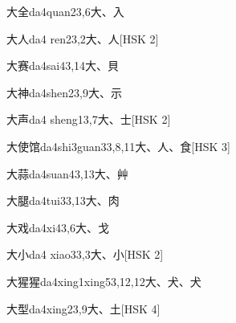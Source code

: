 \begin{entry}{大全}{da4quan2}{3,6}{⼤、⼊}
\end{entry}

\begin{entry}{大人}{da4 ren2}{3,2}{⼤、⼈}[HSK 2]
\end{entry}

\begin{entry}{大赛}{da4sai4}{3,14}{⼤、⾙}
\end{entry}

\begin{entry}{大神}{da4shen2}{3,9}{⼤、⽰}
\end{entry}

\begin{entry}{大声}{da4 sheng1}{3,7}{⼤、⼠}[HSK 2]
\end{entry}

\begin{entry}{大使馆}{da4shi3guan3}{3,8,11}{⼤、⼈、⾷}[HSK 3]
\end{entry}

\begin{entry}{大蒜}{da4suan4}{3,13}{⼤、⾋}
\end{entry}

\begin{entry}{大腿}{da4tui3}{3,13}{⼤、⾁}
\end{entry}

\begin{entry}{大戏}{da4xi4}{3,6}{⼤、⼽}
\end{entry}

\begin{entry}{大小}{da4 xiao3}{3,3}{⼤、⼩}[HSK 2]
\end{entry}

\begin{entry}{大猩猩}{da4xing1xing5}{3,12,12}{⼤、⽝、⽝}
\end{entry}

\begin{entry}{大型}{da4xing2}{3,9}{⼤、⼟}[HSK 4]
\end{entry}

